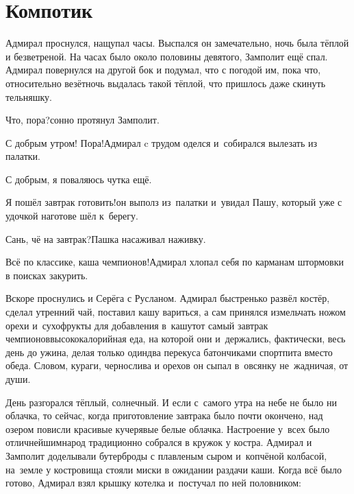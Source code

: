 \chapter{Компотик}
\vepsianrose

Адмирал проснулся, нащупал часы. Выспался он замечательно, ночь была тёплой и безветреной. На часах было около половины девятого, Замполит ещё спал. Адмирал повернулся на другой бок и подумал, что с погодой им, пока что, относительно везёт\mdash ночь выдалась такой тёплой, что пришлось даже скинуть тельняшку.

\diagdash Что, пора?\mdash сонно протянул Замполит.

\diagdash С добрым утром! Пора!\mdash Адмирал c трудом оделся и~собирался вылезать из палатки.

\diagdash С добрым, я поваляюсь чутка ещё.

\diagdash Я пошёл завтрак готовить!\mdash он выполз из~палатки и~увидал Пашу, который уже с удочкой наготове шёл к~берегу.

\diagdash Сань, чё на завтрак?\mdash Пашка насаживал наживку.

\diagdash Всё по классике, каша чемпионов!\mdash Адмирал хлопал себя по карманам штормовки в поисках закурить.

Вскоре проснулись и Серёга с Русланом. Адмирал быстренько развёл костёр, сделал утренний чай, поставил кашу вариться, а сам принялся измельчать ножом орехи и~сухофрукты для добавления в~кашу\mdash тот самый завтрак чемпионов\mdash высококалорийная еда, на которой они и~держались, фактически, весь день до ужина, делая только один\sdash два перекуса батончиками спортпита вместо обеда. Словом, кураги, чернослива и орехов он сыпал в~овсянку не~жадничая, от души.

День разгорался тёплый, солнечный. И если с~самого утра на небе не было ни облачка, то сейчас, когда приготовление завтрака было почти окончено, над озером повисли красивые кучерявые белые облачка. Настроение у~всех было отличнейшим\mdash народ традиционно собрался в кружок у костра. Адмирал и Замполит доделывали бутерброды с плавленым сыром и~копчёной колбасой, на~земле у костровища стояли миски в ожидании раздачи каши. Когда всё было готово, Адмирал взял крышку котелка и~постучал по ней половником:

